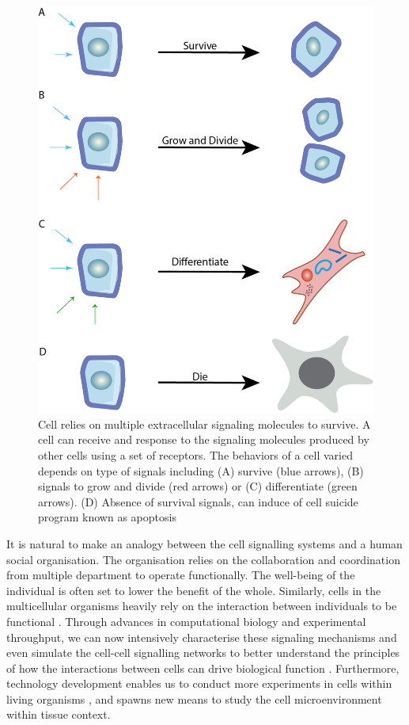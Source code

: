 \begin{figure}[htp]
    \centering
    \includegraphics[width=0.6\columnwidth]{Chapter1/Figures/Chap1_figure1.png}
    \caption{Cell relies on multiple extracellular signaling molecules to survive. A cell can receive and response to the signaling molecules produced by other cells using a set of receptors. The behaviors of a cell varied depends on type of signals including (A) survive (blue arrows), (B) signals to grow and divide (red arrows) or (C) differentiate (green arrows). (D) Absence of survival signals, can induce of cell suicide program known as apoptosis}
    \label{fig:Chap1_figure1}
\end{figure}

It is natural to make an analogy between the cell signalling systems and a human social organisation. The organisation relies on the collaboration and coordination from multiple department to operate functionally. The well-being of the individual is often set to lower the benefit of the whole. Similarly, cells in the multicellular organisms heavily rely on the interaction between individuals to be functional \cite{bartee2018principles}. Through advances in computational biology and experimental throughput, we can now intensively characterise these signaling mechanisms and even simulate the cell-cell signalling networks to better understand the principles of how the interactions between cells can drive biological function \cite{sprinzak2010cis, teague2016synthetic, toda2019engineering}. Furthermore, technology development enables us to conduct more experiments in cells within living organisms \cite{helmchen2005deep, periasamy2013methods}, and spawns new means to study the cell microenvironment within tissue context. 

